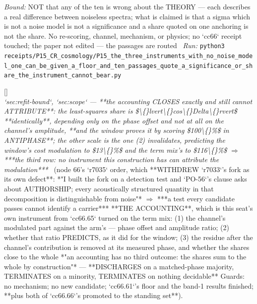 \begin{description}
 \emph{Bound:}  NOT that any of the ten is wrong about the THEORY --- each describes a real difference between noiseless spectra; what is claimed is that a sigma which is not a noise model is not a significance and a share quoted on one anchoring is not the share. No re-scoring, channel, mechanism, or physics; no `cc66` receipt touched; the paper not edited --- the passages are routed
\ \emph{Run:} \texttt{python3 receipts/P15\_CR\_cosmology/P15\_the\_three\_instruments\_with\_no\_noise\_model\_one\_can\_be\_given\_a\_floor\_and\_ten\_passages\_quote\_a\_significance\_or\_share\_the\_instrument\_cannot\_bear.py}
\item[\rcptlabel{P15_the_accounting_closes_but_cannot_attribute_because_the_share_is_the_cosine_of_a_phase_offset}{P15R216}\textbf{P15R216}\quad\texttt{P15\_the\_accounting\_closes\_but\_cannot\_attribute\_because\_the\_share\_is\_the\_cosine\_of\_a\_phase\_offset}]\hfill\textsf{[]}\\
\textit{`sec:refit-bound`, `sec:scope` --- **the accounting CLOSES exactly and still cannot ATTRIBUTE**: the least-squares share is \$\textbackslash\{\}lvert\textbackslash\{\}cos\textbackslash\{\}Delta\textbackslash\{\}rvert\$ **identically**, depending only on the phase offset and not at all on the channel's amplitude, **and the window proves it by scoring \$100\textbackslash\{\}\%\$ in ANTIPHASE**; the other scale is the one (2) invalidates, predicting the window's cost modulation to \$13\textbackslash\{\}\%\$ and the term mix's to \$116\textbackslash\{\}\%\$ \ensuremath{\Rightarrow} ***the third row: no instrument this construction has can attribute the modulation***} \ (node 66's `r7035` order, which **WITHDREW `r7033`'s fork as its own defect**: *"I built the fork on a detection test and `PO-56`'s clause asks about AUTHORSHIP; every acoustically structured quantity in that decomposition is distinguishable from noise"* \ensuremath{\Rightarrow} ***a test every candidate passes cannot identify a carrier***  **THE ACCOUNTING**, which is this seat's own instrument from `cc66.65` turned on the term mix: (1) the channel's modulated part against the arm's --- phase offset and amplitude ratio; (2) whether that ratio PREDICTS, as it did for the window; (3) the residue after the channel's contribution is removed at its measured phase, and whether the shares close to the whole   *"an accounting has no third outcome: the shares sum to the whole by construction"* --- **DISCHARGES on a matched-phase majority, TERMINATES on a minority, TERMINATES on nothing decidable**   Guards: no mechanism; no new candidate; `cc66.61`'s floor and the band-1 results finished; **plus both of `cc66.66`'s promoted to the standing set**). 

\end{description}
